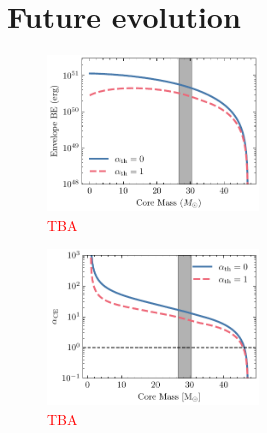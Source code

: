\documentclass[linenumbers,trackchanges,twocolumn]{aastex701}
\newcommand{\red}{\textcolor{red}}
\begin{document}
\section{Future evolution}

\begin{figure}[htbp]
    \centering
    \includegraphics[width=0.5\textwidth]{xrb_be.pdf}
    \caption{\red{TBA}}
    \label{fig:xrb_be}
\end{figure}

\begin{figure}[htbp]
    \centering
    \includegraphics[width=0.5\textwidth]{xrb_alpha_ce.pdf}
    \caption{\red{TBA}}
    \label{fig:xrb_alpha_ce}
\end{figure}
\end{document}
